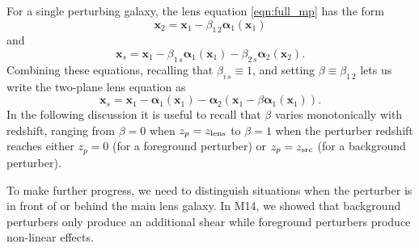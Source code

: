 \documentclass{emulateapj}
\newcommand\x[0]{\mathbf{x}}
\newcommand\al[0]{\boldsymbol{\alpha}}
\begin{document}
For a single perturbing galaxy, the lens equation \ref{eqn:full_mp} has the form
\begin{equation}
\x_2 = \x_1 - \beta_{1\,2} \al_1(\x_1)
\end{equation}
and
\begin{equation}
\x_s = \x_1 - \beta_{1\,s} \al_1(\x_1) - \beta_{2\,s} \al_2(\x_2).
\end{equation}
Combining these equations, recalling that $\beta_{i\,s} \equiv 1$, and setting $\beta \equiv \beta_{1\,2}$ lets us write the two-plane lens equation as
\begin{equation}
\x_s = \x_1 - \al_1(\x_1) - \al_2\left(\x_1 - \beta \al_1(\x_1)\right).
\label{eqn:twoplane}
\end{equation}
In the following discussion it is useful to recall that $\beta$ varies monotonically with redshift, ranging from $\beta = 0$ when $z_p = z_{\rm{lens}}$ to $\beta = 1$ when the perturber redshift reaches either $z_p = 0$ (for a foreground perturber) or $z_p = z_{\rm{src}}$ (for a background perturber).

To make further progress, we need to distinguish situations when the perturber is in front of or behind the main lens galaxy. In M14, we showed that background perturbers only produce an additional shear while foreground perturbers produce non-linear effects.
\end{document}
